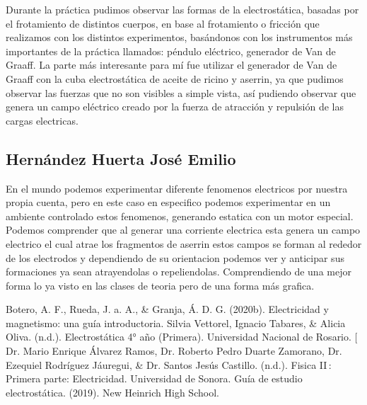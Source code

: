 \documentclass[14pt]{article}
\begin{document}
Durante la práctica pudimos observar las formas de la electrostática, basadas por el frotamiento de distintos cuerpos, en base al frotamiento o fricción que realizamos con los distintos experimentos, basándonos con los instrumentos más importantes de la práctica llamados: péndulo eléctrico, generador de Van de Graaff. La parte más interesante para mí fue utilizar el generador de Van de Graaff con la cuba electrostática de aceite de ricino y aserrin, ya que pudimos observar las fuerzas que no son visibles a simple vista, así pudiendo observar que genera un campo eléctrico creado por la fuerza de atracción y repulsión de las cargas electricas.

\subsection{Hernández Huerta José Emilio}
En el mundo podemos experimentar diferente fenomenos electricos por nuestra propia cuenta, pero en este caso en especifico podemos experimentar en un ambiente controlado estos fenomenos, generando estatica con un motor especial. 
Podemos comprender que al generar una corriente electrica esta genera un campo electrico el cual atrae los fragmentos de aserrin estos campos se forman al rededor de los electrodos y dependiendo de su orientacion podemos ver y anticipar sus formaciones ya sean atrayendolas o repeliendolas. Comprendiendo de una mejor forma lo ya visto en las clases de teoria pero de una forma más grafica.


\clearpage
\newpage	
	\begin{thebibliography}{0}
		Botero, A. F., Rueda, J. a. A., \& Granja, Á. D. G. (2020b). Electricidad y magnetismo: una guía introductoria.
		Silvia Vettorel, Ignacio Tabares, \& Alicia Oliva. (n.d.). Electrostática 4° año (Primera). Universidad Nacional de Rosario.
		[ Dr. Mario Enrique Álvarez Ramos, Dr. Roberto Pedro Duarte Zamorano, Dr. Ezequiel Rodríguez Jáuregui, \& Dr. Santos Jesús Castillo. (n.d.). Fisica II : Primera parte: Electricidad. Universidad de Sonora.
		Guía de estudio electrostática. (2019). New Heinrich High School.
	\end{thebibliography}
\end{document}
